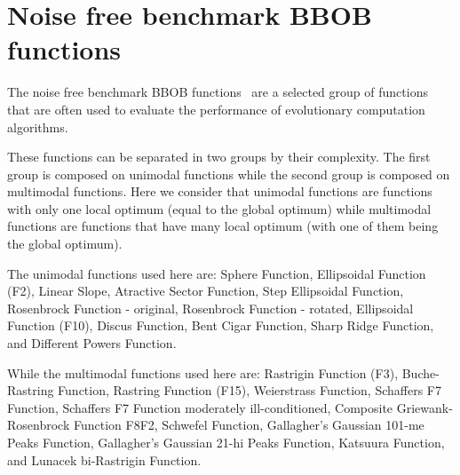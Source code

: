 \section{Noise free benchmark BBOB functions}

The noise free benchmark BBOB functions~\cite{hansen2010real} are a
selected group of functions that are often used to evaluate the
performance of evolutionary computation algorithms.


These functions can be separated in two groups by their
complexity. The first group is composed on unimodal functions while
the second group is composed on multimodal functions. Here we consider
that unimodal functions are functions with only one local optimum
(equal to the global optimum) while multimodal functions are functions
that have many local optimum (with one of them being the global
optimum).

The unimodal functions used here are: Sphere Function, Ellipsoidal
Function (F2), Linear Slope, Atractive Sector Function, Step
Ellipsoidal Function, Rosenbrock Function - original, Rosenbrock
Function - rotated, Ellipsoidal Function (F10), Discus Function, Bent
Cigar Function, Sharp Ridge Function, and Different Powers Function.

While the multimodal functions used here are: Rastrigin Function (F3),
Buche-Rastring Function, Rastring Function (F15), Weierstrass
Function, Schaffers F7 Function, Schaffers F7 Function moderately
ill-conditioned, Composite Griewank-Rosenbrock Function F8F2, Schwefel
Function, Gallagher's Gaussian 101-me Peaks Function, Gallagher's
Gaussian 21-hi Peaks Function, Katsuura Function, and Lunacek
bi-Rastrigin Function.
